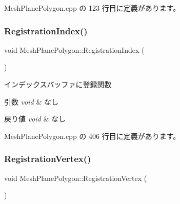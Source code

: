  Mesh\+Plane\+Polygon.\+cpp の 123 行目に定義があります。

\mbox{\label{class_mesh_plane_polygon_aab346c974196e257399095dd914aaa51}} 
\subsubsection{\texorpdfstring{Registration\+Index()}{RegistrationIndex()}}
{\footnotesize\ttfamily void Mesh\+Plane\+Polygon\+::\+Registration\+Index (\begin{DoxyParamCaption}{ }\end{DoxyParamCaption})\hspace{0.3cm}{\ttfamily [private]}}



インデックスバッファに登録関数 


\begin{DoxyParams}{引数}
{\em void} & なし \\
\hline
\end{DoxyParams}

\begin{DoxyRetVals}{戻り値}
{\em void} & なし \\
\hline
\end{DoxyRetVals}


 Mesh\+Plane\+Polygon.\+cpp の 406 行目に定義があります。

\mbox{\label{class_mesh_plane_polygon_ae3c43c5641c962ac848b3dadd3ea15e5}} 
\subsubsection{\texorpdfstring{Registration\+Vertex()}{RegistrationVertex()}}
{\footnotesize\ttfamily void Mesh\+Plane\+Polygon\+::\+Registration\+Vertex (\begin{DoxyParamCaption}{ }\end{DoxyParamCaption})\hspace{0.3cm}{\ttfamily [private]}}



